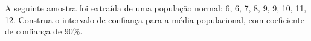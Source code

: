 %
%


\begin{exercicioBanco}[\valorquestao]
    A seguinte amostra foi extraída de uma população normal: 6, 6, 7, 8, 9, 9, 10, 11, 12. Construa o intervalo de confiança para a média populacional, com coeficiente de confiança de 90\%.
    
\end{exercicioBanco}

